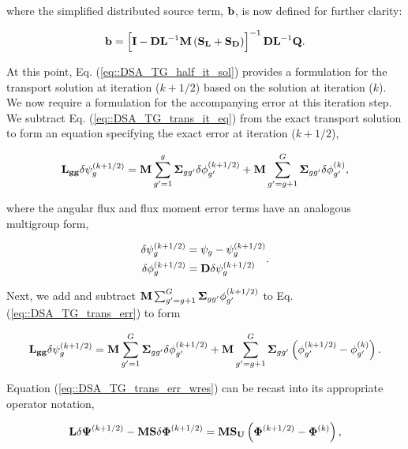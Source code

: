 \noindent where the simplified distributed source term, ${\bf b}$, is now defined for further clarity:

\begin{equation}
\label{eq::DSA_TG_half_it_forcingfunc}
{\bf b} = \left[ {\bf I} - {\bf D}{\bf L}^{-1} {\bf M} \left(  {\bf S_L} + {\bf S_D} \right) \right]^{-1} {\bf D}{\bf L}^{-1}  {\bf Q} .
\end{equation}

At this point, Eq. (\ref{eq::DSA_TG_half_it_sol}) provides a formulation for the transport solution at iteration ($k+1/2$) based on the solution at iteration ($k$). We now require a formulation for the accompanying error at this iteration step. We subtract Eq. (\ref{eq::DSA_TG_trans_it_eq}) from the exact transport solution to form an equation specifying the exact error at iteration ($k+1/2$),

\begin{equation}
\label{eq::DSA_TG_trans_err}
{\bf L_{gg}} \delta \psi_g^{(k+1/2)} = {\bf M} \sum_{g'=1}^g {\bf \Sigma}_{g g'}\delta \phi_{g'}^{(k+1/2)} + {\bf M} \sum_{g'=g+1}^G {\bf \Sigma}_{g g'} \delta \phi_{g'}^{(k)},
\end{equation}

\noindent where the angular flux and flux moment error terms have an analogous multigroup form,

\begin{equation}
\label{eq::DSA_TG_error_terms}
\begin{aligned}
\delta \psi_g^{(k+1/2)} &= \psi_g - \psi_g^{(k+1/2)} \\
\delta \phi_g^{(k+1/2)} &= {\bf D} \delta \psi_g^{(k+1/2)}
\end{aligned} .
\end{equation}

\noindent Next, we add and subtract ${\bf M} \sum_{g'=g+1}^G {\bf \Sigma}_{g g'} \phi_{g'}^{(k+1/2)}$ to Eq. (\ref{eq::DSA_TG_trans_err}) to form

\begin{equation}
\label{eq::DSA_TG_trans_err_wres}
{\bf L_{gg}} \delta \psi_g^{(k+1/2)} = {\bf M} \sum_{g'=1}^G {\bf \Sigma}_{g g'}\delta \phi_{g'}^{(k+1/2)} + {\bf M} \sum_{g'=g+1}^G {\bf \Sigma}_{g g'} \left( \phi_{g'}^{(k+1/2)} - \phi_{g'}^{(k)} \right) .
\end{equation}

\noindent Equation (\ref{eq::DSA_TG_trans_err_wres}) can be recast into its appropriate operator notation,

\begin{equation}
\label{eq::DSA_TG_trans_err_wres_op}
{\bf L} \delta {\bf \Psi}^{(k+1/2)} - {\bf M}   {\bf S} \delta {\bf \Phi}^{(k+1/2)} = {\bf M} {\bf S_U}  \left( {\bf \Phi}^{(k+1/2)} - {\bf \Phi}^{(k)} \right),
\end{equation}

